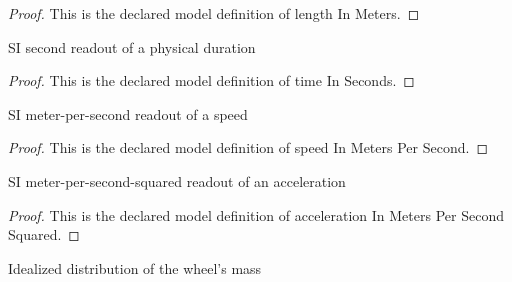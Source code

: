 \begin{proof}
  This is the declared model definition of length In Meters.
\end{proof}
\begin{definition}
  \label{def:physics:phyx-mini-0771:phyxminiproblems-problemphyxmini0771-timeinseconds}
  SI second readout of a physical duration
\end{definition}
\begin{proof}
  This is the declared model definition of time In Seconds.
\end{proof}
\begin{definition}
  \label{def:physics:phyx-mini-0771:phyxminiproblems-problemphyxmini0771-speedinmeterspersecond}
  SI meter-per-second readout of a speed
\end{definition}
\begin{proof}
  This is the declared model definition of speed In Meters Per Second.
\end{proof}
\begin{definition}
  \label{def:physics:phyx-mini-0771:phyxminiproblems-problemphyxmini0771-accelerationinmeterspersecondsquared}
  SI meter-per-second-squared readout of an acceleration
\end{definition}
\begin{proof}
  This is the declared model definition of acceleration In Meters Per Second Squared.
\end{proof}
\begin{definition}
  \label{def:physics:phyx-mini-0771:phyxminiproblems-problemphyxmini0771-wheelmassdistribution}
  Idealized distribution of the wheel's mass
\end{definition}
